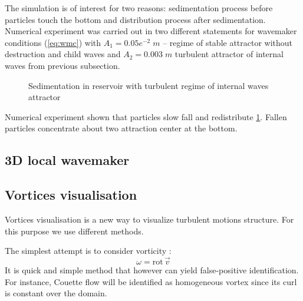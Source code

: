 \documentclass{article}
\begin{document}
The simulation is of interest for two reasons: sedimentation process before particles touch the bottom and distribution process after sedimentation. Numerical experiment was carried out in two different statements for wavemaker conditions (\ref{eq:wmc}) with $A_1=0.05e^{-2}\;m$ -- regime of stable attractor without destruction and child waves and $A_2=0.003\;m$ turbulent attractor of internal waves from previous subsection. 

\begin{figure}
\centering
    \begin{minipage}{0.45\textwidth}
        \centering
        \label{fig:turbSed2Da}
    \end{minipage}
    \begin{minipage}{0.45\textwidth}
        \centering
        \label{fig:turbSed2Da}
    \end{minipage}
    \caption{Sedimentation in reservoir with turbulent regime of internal waves attractor}
\end{figure}

Numerical experiment shown that particles slow fall and redistribute \ref{fig:turbSed2Da}. Fallen particles concentrate about two attraction center at the bottom.

\subsection{3D local wavemaker}


\subsection{Vortices visualisation}

Vortices visualisation is a new way to visualize turbulent motions structure. For this purpose we use different methods.

The simplest attempt is to consider vorticity \cite{vortex}: $$\omega=\textrm{rot}\,\vec{v}$$
It is quick and simple method that however can yield false-positive identification. For instance, Couette flow will be identified as homogeneous vortex since its curl is constant over the domain.
\end{document}
